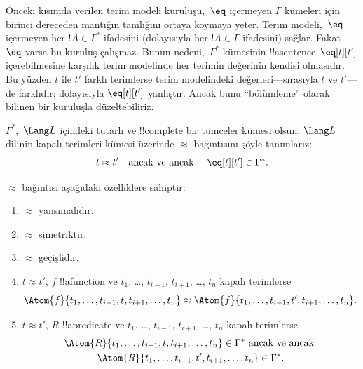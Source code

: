 


\begin{explain}
Önceki kısımda verilen terim modeli kuruluşu,~$\eq$ içermeyen
$\Gamma$ kümeleri için birinci dereceden mantığın tamlığını ortaya
koymaya yeter. Terim modeli,~$\eq$ içermeyen her $!A\in\Gamma^*$
ifadesini (dolayısıyla her $!A\in\Gamma$ ifadesini) sağlar. Fakat
$\eq$ varsa bu kuruluş çalışmaz. Bunun nedeni,~$\Gamma^*$ kümesinin
!!a{sentence}~$\eq[t][t']$ içerebilmesine karşılık terim modelinde her
terimin değerinin kendisi olmasıdır. Bu yüzden $t$ ile $t'$ farklı
terimlerse terim modelindeki değerleri---sırasıyla $t$ ve $t'$---de
farklıdır; dolayısıyla $\eq[t][t']$ yanlıştır. Ancak bunu
``bölümleme'' olarak bilinen bir kuruluşla düzeltebiliriz.
\end{explain}

\begin{defn}
  $\Gamma^*$,~$\Lang L$ içindeki tutarlı ve !!{complete} bir tümceler
  kümesi olsun. $\Lang L$ dilinin kapalı terimleri kümesi üzerinde
  $\approx$ bağıntısını şöyle tanımlarız:
  \[
  t \approx t' \text{\quad ancak ve ancak \quad} \eq[t][t'] \in \Gamma^*.
  \]
\end{defn}

\begin{prop}
$\approx$ bağıntısı aşağıdaki özelliklere sahiptir:
\begin{enumerate}
\item $\approx$ yansımalıdır.
\item $\approx$ simetriktir.
\item $\approx$ geçişlidir.
\item $t\approx t'$, $f$ !!a{function} ve $t_1$, \dots,
  $t_{i-1}$, $t_{i+1}$, \dots, $t_n$ kapalı terimlerse
\[
\Atom{f}{t_1,\dots, t_{i-1}, t, t_{i+1}, \dots, t_n} \approx
\Atom{f}{t_1,\dots, t_{i-1}, t', t_{i+1}, \dots, t_n}.
\]
\item $t\approx t'$, $R$ !!a{predicate} ve $t_1$, \dots,
  $t_{i-1}$, $t_{i+1}$, \dots, $t_n$ kapalı terimlerse
\begin{multline*}
\Atom{R}{t_1,\dots, t_{i-1}, t, t_{i+1}, \dots, t_n} \in \Gamma^*
\text{ ancak ve ancak } \\
\Atom{R}{t_1,\dots, t_{i-1}, t', t_{i+1}, \dots, t_n} \in \Gamma^*.
\end{multline*}
\end{enumerate}
\end{prop}

